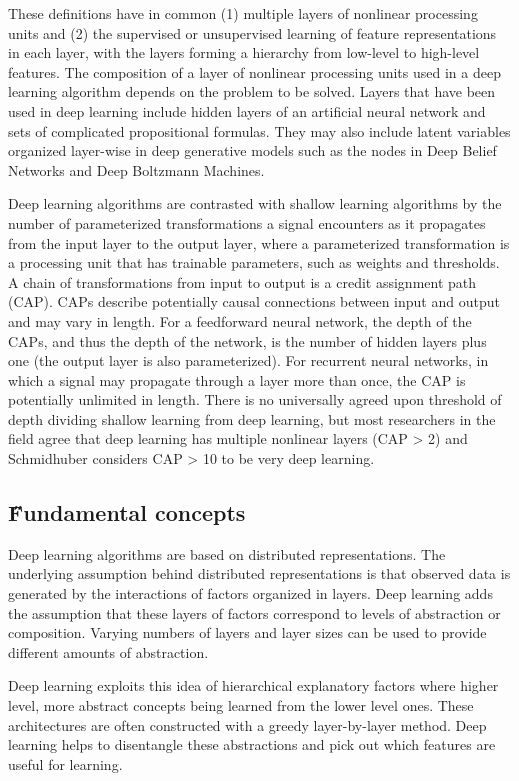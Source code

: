 \documentclass[12pt]{article}
\begin{document}
These definitions have in common (1) multiple layers of nonlinear processing units and (2) the supervised or unsupervised learning of feature representations in each layer, with the layers forming a hierarchy from low-level to high-level features. The composition of a layer of nonlinear processing units used in a deep learning algorithm depends on the problem to be solved. Layers that have been used in deep learning include hidden layers of an artificial neural network and sets of complicated propositional formulas. They may also include latent variables organized layer-wise in deep generative models such as the nodes in Deep Belief Networks and Deep Boltzmann Machines.

Deep learning algorithms are contrasted with shallow learning algorithms by the number of parameterized transformations a signal encounters as it propagates from the input layer to the output layer, where a parameterized transformation is a processing unit that has trainable parameters, such as weights and thresholds. A chain of transformations from input to output is a credit assignment path (CAP). CAPs describe potentially causal connections between input and output and may vary in length. For a feedforward neural network, the depth of the CAPs, and thus the depth of the network, is the number of hidden layers plus one (the output layer is also parameterized). For recurrent neural networks, in which a signal may propagate through a layer more than once, the CAP is potentially unlimited in length. There is no universally agreed upon threshold of depth dividing shallow learning from deep learning, but most researchers in the field agree that deep learning has multiple nonlinear layers (CAP > 2) and Schmidhuber considers CAP > 10 to be very deep learning.

\subsection{\H Fundamental concepts}
Deep learning algorithms are based on distributed representations. The underlying assumption behind distributed representations is that observed data is generated by the interactions of factors organized in layers. Deep learning adds the assumption that these layers of factors correspond to levels of abstraction or composition. Varying numbers of layers and layer sizes can be used to provide different amounts of abstraction.

Deep learning exploits this idea of hierarchical explanatory factors where higher level, more abstract concepts being learned from the lower level ones. These architectures are often constructed with a greedy layer-by-layer method. Deep learning helps to disentangle these abstractions and pick out which features are useful for learning.
\end{document}
